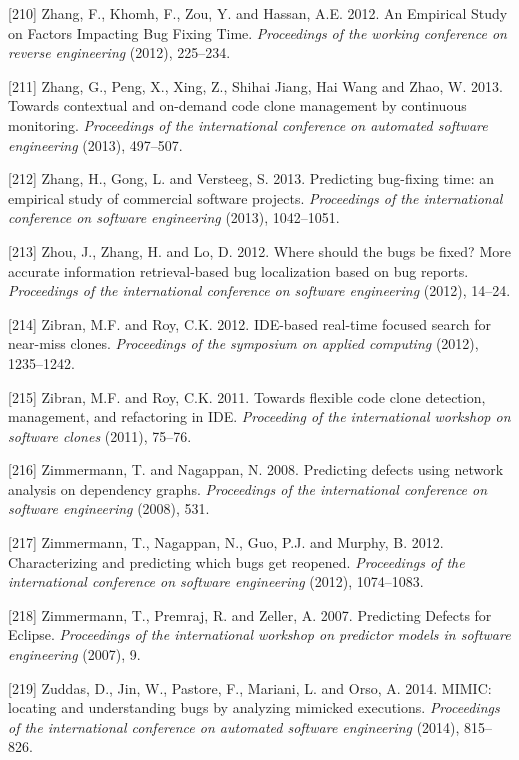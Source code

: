 \documentclass[12pt]{report}
\begin{document}
\hypertarget{ref-Zhang2012}{}
{[}210{]} Zhang, F., Khomh, F., Zou, Y. and Hassan, A.E. 2012. An
Empirical Study on Factors Impacting Bug Fixing Time. \emph{Proceedings
of the working conference on reverse engineering} (2012), 225--234.

\hypertarget{ref-Zhang2013a}{}
{[}211{]} Zhang, G., Peng, X., Xing, Z., Shihai Jiang, Hai Wang and
Zhao, W. 2013. Towards contextual and on-demand code clone management by
continuous monitoring. \emph{Proceedings of the international conference
on automated software engineering} (2013), 497--507.

\hypertarget{ref-Zhang2013}{}
{[}212{]} Zhang, H., Gong, L. and Versteeg, S. 2013. Predicting
bug-fixing time: an empirical study of commercial software projects.
\emph{Proceedings of the international conference on software
engineering} (2013), 1042--1051.

\hypertarget{ref-Zhou2012}{}
{[}213{]} Zhou, J., Zhang, H. and Lo, D. 2012. Where should the bugs be
fixed? More accurate information retrieval-based bug localization based
on bug reports. \emph{Proceedings of the international conference on
software engineering} (2012), 14--24.

\hypertarget{ref-Zibran2012}{}
{[}214{]} Zibran, M.F. and Roy, C.K. 2012. IDE-based real-time focused
search for near-miss clones. \emph{Proceedings of the symposium on
applied computing} (2012), 1235--1242.

\hypertarget{ref-Zibran2011}{}
{[}215{]} Zibran, M.F. and Roy, C.K. 2011. Towards flexible code clone
detection, management, and refactoring in IDE. \emph{Proceeding of the
international workshop on software clones} (2011), 75--76.

\hypertarget{ref-Zimmermann2008}{}
{[}216{]} Zimmermann, T. and Nagappan, N. 2008. Predicting defects using
network analysis on dependency graphs. \emph{Proceedings of the
international conference on software engineering} (2008), 531.

\hypertarget{ref-Zimmermann2012}{}
{[}217{]} Zimmermann, T., Nagappan, N., Guo, P.J. and Murphy, B. 2012.
Characterizing and predicting which bugs get reopened. \emph{Proceedings
of the international conference on software engineering} (2012),
1074--1083.

\hypertarget{ref-Zimmermann2007}{}
{[}218{]} Zimmermann, T., Premraj, R. and Zeller, A. 2007. Predicting
Defects for Eclipse. \emph{Proceedings of the international workshop on
predictor models in software engineering} (2007), 9.

\hypertarget{ref-Zuddas2014}{}
{[}219{]} Zuddas, D., Jin, W., Pastore, F., Mariani, L. and Orso, A.
2014. MIMIC: locating and understanding bugs by analyzing mimicked
executions. \emph{Proceedings of the international conference on
automated software engineering} (2014), 815--826.

\end{document}
